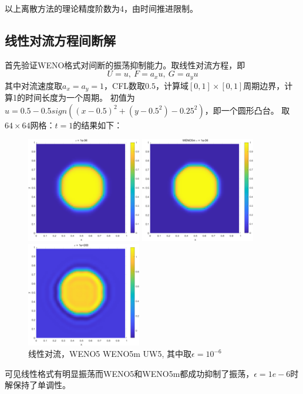 \documentclass[UTF8,zihao=5]{ctexart} %
\begin{document}
以上离散方法的理论精度阶数为4，由时间推进限制。

\subsection{线性对流方程间断解}

首先验证WENO格式对间断的振荡抑制能力。取线性对流方程，即
$$
    U=u,\ F=a_x u,\ G=a_y u
$$
其中对流速度取$a_x=a_y=1$，CFL数取$0.5$，计算域$[0,1]\times[0,1]$周期边界，计算1的时间长度为一个周期。
初值为$u=0.5-0.5sign((x-0.5)^2+(y-0.5^2)-0.25^2)$，即一个圆形凸台。
取$64\times64$网格：$t=1$的结果如下：
\begin{figure}[H]
    \begin{minipage}[c]{0.32\linewidth}  %
        \centering
        \includegraphics[width=5cm]{Linconv_E6.png}  %
    \end{minipage}
    \hfill %
    \begin{minipage}[c]{0.32\linewidth}  %
        \centering
        \includegraphics[width=5cm]{Linconv_E6m.png}  %
    \end{minipage}
    \hfill %
    \begin{minipage}[c]{0.32\linewidth}  %
        \centering
        \includegraphics[width=5cm]{Linconv_LIN.png}  %
    \end{minipage}
    \caption{线性对流，WENO5 WENO5m UW5, 其中取$\epsilon=10^{-6}$}
\end{figure}
可见线性格式有明显振荡而WENO5和WENO5m都成功抑制了振荡，$\epsilon=1e-6$时解保持了单调性。
\end{document}
